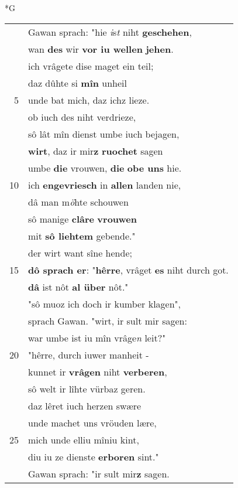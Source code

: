 \documentclass[8pt,a4paper,notitlepage]{article}
\begin{document}
\begin{table}[ht]
\begin{minipage}[t]{0.5\linewidth}
\small
\begin{center}*G
\end{center}
\begin{tabular}{rl}
 & Gawan sprach: "hie \textit{i}s\textit{t} niht \textbf{geschehen},\\ 
 & wan \textbf{des} wir \textbf{vor iu wellen} \textbf{jehen}.\\ 
 & ich vrâgete dise maget ein teil;\\ 
 & daz dûhte si \textbf{mîn} unheil\\ 
5 & unde bat mich, daz ichz lieze.\\ 
 & ob iuch des niht verdrieze,\\ 
 & sô lât mîn dienst umbe iuch bejagen,\\ 
 & \textbf{wirt}, daz ir mir\textbf{z} \textbf{ruochet} sagen\\ 
 & umbe \textbf{die} vrouwen, \textbf{die} \textbf{obe uns} hie.\\ 
10 & ich \textbf{en}\textbf{gevriesch} in \textbf{allen} landen nie,\\ 
 & dâ man m\textit{ö}hte schouwen\\ 
 & sô manige \textbf{clâre} \textbf{vrouwen}\\ 
 & mit \textbf{sô liehtem} gebende."\\ 
 & der wirt want sîne hende;\\ 
15 & \textbf{dô sprach er}: "\textbf{hêrre}, vrâget \textbf{es} niht durch got.\\ 
 & \textbf{dâ} ist nôt \textbf{al über} nôt."\\ 
 & "sô muoz ich doch ir kumber klagen",\\ 
 & sprach Gawan. "wirt, ir sult mir sagen:\\ 
 & war umbe ist iu mîn vrâge\textit{n} leit?"\\ 
20 & "hêrre, durch iuwer manheit -\\ 
 & kunnet ir \textbf{vrâgen} niht \textbf{verberen},\\ 
 & sô welt ir lîhte vürbaz geren.\\ 
 & daz lêret iuch herzen swære\\ 
 & unde machet uns vröuden lære,\\ 
25 & mich unde elliu mîniu kint,\\ 
 & diu iu ze dienste \textbf{erboren} sint."\\ 
 & Gawan sprach: "ir sult mir\textbf{z} sagen.\\ 

\end{tabular}
\end{minipage}
\end{table}
\end{document}

